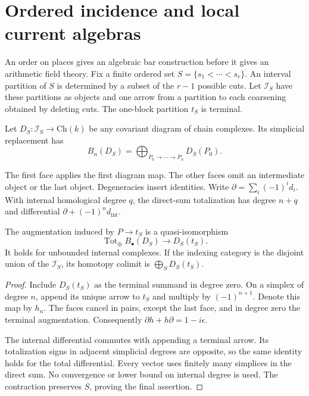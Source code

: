 \section{Ordered incidence and local current algebras}
\label{v4-arith:cs:incidence}

An order on places gives an algebraic bar construction before it gives an
arithmetic field theory. Fix a finite ordered set \(S=\{s_1<\cdots<s_r\}\).
An interval partition of \(S\) is determined by a subset of the \(r-1\)
possible cuts. Let \(\mathcal I_S\) have these partitions as objects and one
arrow from a partition to each coarsening obtained by deleting cuts. The
one-block partition \(t_S\) is terminal.

Let \(D_S:\mathcal I_S\to\mathrm{Ch}(k)\) be any covariant diagram of chain
complexes. Its simplicial replacement has
\[
 B_n(D_S)=\bigoplus_{P_0\to\cdots\to P_n}D_S(P_0).
\]

The first face applies the first diagram map. The other faces omit an
intermediate object or the last object. Degeneracies insert identities.
Write \(\partial=\sum_i(-1)^id_i\). With internal homological degree \(q\),
the direct-sum totalization has degree \(n+q\) and differential
\(\partial+(-1)^n d_{\mathrm{int}}\).

\begin{proposition}
\label{v4-arith:cs:prop:incidence}
The augmentation induced by \(P\to t_S\) is a quasi-isomorphism
\begin{equation}
 \operatorname{Tot}_{\oplus}B_\bullet(D_S)
              \longrightarrow D_S(t_S).
 \label{v4-arith:cs:eq:incidence-contraction}
\end{equation}
It holds for unbounded internal complexes. If the indexing category is the
disjoint union of the \(\mathcal I_S\), its homotopy colimit is
\(\bigoplus_SD_S(t_S)\).
\end{proposition}

\begin{proof}
Include \(D_S(t_S)\) as the terminal summand in degree zero. On a simplex of
degree \(n\), append its unique arrow to \(t_S\) and multiply by
\((-1)^{n+1}\). Denote this map by \(h_n\). The faces cancel in pairs,
except the last face, and in degree zero the terminal augmentation.
Consequently \(\partial h+h\partial=1-i\epsilon\).

The internal differential commutes with appending a terminal arrow. Its
totalization signs in adjacent simplicial degrees are opposite, so the same
identity holds for the total differential. Every vector uses finitely many
simplices in the direct sum. No convergence or lower bound on internal
degree is used. The contraction preserves \(S\), proving the final
assertion.
\end{proof}

